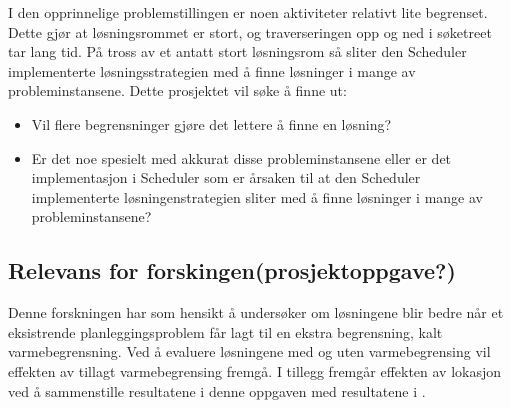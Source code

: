I den opprinnelige problemstillingen \cite{tvedtbezem} er noen aktiviteter relativt lite begrenset. Dette gjør at løsningsrommet er stort, og traverseringen opp og ned i søketreet tar lang tid. På tross av et antatt stort løsningsrom så sliter den Scheduler implementerte løsningsstrategien med å finne løsninger i mange av probleminstansene. Dette prosjektet vil søke å finne ut:

\begin{itemize}
\item Vil flere begrensninger gjøre det lettere å finne en løsning?
\item Er det noe spesielt med akkurat disse probleminstansene eller er det implementasjon i Scheduler som er årsaken til at den Scheduler implementerte løsningenstrategien sliter med å finne løsninger i mange av probleminstansene?
\end{itemize}

\subsection{Relevans for forskingen(prosjektoppgave?)}
Denne forskningen har som hensikt å undersøker om løsningene blir bedre når et eksistrende planleggingsproblem får lagt til en ekstra begrensning, kalt varmebegrensning. Ved å evaluere løsningene med og uten varmebegrensing vil effekten av tillagt varmebegrensing fremgå. I tillegg fremgår effekten av lokasjon ved å sammenstille resultatene i denne oppgaven med resultatene i \cite{tvedtbezem}.